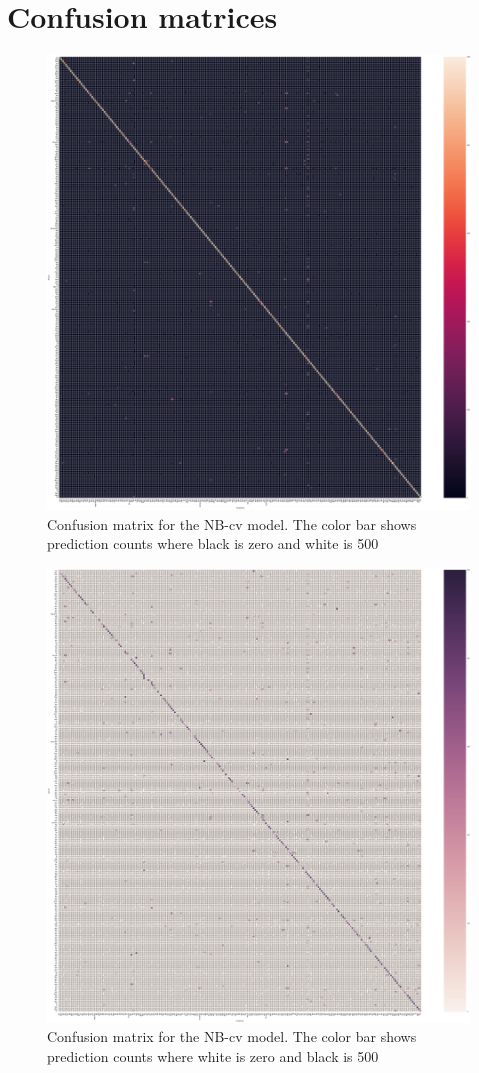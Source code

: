 \documentclass[conference]{IEEEtran}
\begin{document}
\section{Confusion matrices}
\label{appendix}
\begin{figure}[h]
  \centering
      \includegraphics[width=\textwidth]{conf_mat_cv}
		\caption{Confusion matrix for the NB-cv model. The color bar shows prediction counts where black is zero and white is 500}
		\label{fig:conf_mat_cv}      
\end{figure}
\begin{figure}[h]
  \centering
      \includegraphics[width=\textwidth]{conf_mat_lstm}
		\caption{Confusion matrix for the NB-cv model. The color bar shows prediction counts where white is zero and black is 500}
		\label{fig:conf_mat_lstm}      
\end{figure}
\end{document}
